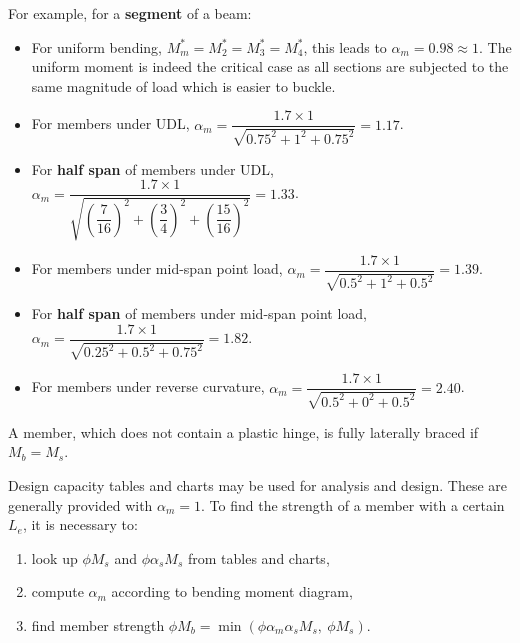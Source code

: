 For example, for a \textbf{segment} of a beam:
\begin{itemize}
\item For uniform bending, $M^*_m=M^*_2=M^*_3=M^*_4$, this leads to $\alpha_m=0.98\approx1$.
The uniform moment is indeed the critical case as all sections are subjected to the same magnitude of load which is easier to buckle.
\begin{figure}[H]
\centering
\end{figure}
\item For members under UDL, $\alpha_m=\dfrac{1.7\times1}{\sqrt{0.75^2+1^2+0.75^2}}=1.17$.
\begin{figure}[H]
\centering
\end{figure}
\item For \textbf{half span} of members under UDL, $\alpha_m=\dfrac{1.7\times1}{\sqrt{\left(\dfrac{7}{16}\right)^2+\left(\dfrac{3}{4}\right)^2+\left(\dfrac{15}{16}\right)^2}}=1.33$.
\begin{figure}[H]
\centering
\end{figure}
\item For members under mid-span point load, $\alpha_m=\dfrac{1.7\times1}{\sqrt{0.5^2+1^2+0.5^2}}=1.39$.
\begin{figure}[H]
\centering
\end{figure}
\item For \textbf{half span} of members under mid-span point load, $\alpha_m=\dfrac{1.7\times1}{\sqrt{0.25^2+0.5^2+0.75^2}}=1.82$.
\begin{figure}[H]
\centering
\end{figure}
\item For members under reverse curvature, $\alpha_m=\dfrac{1.7\times1}{\sqrt{0.5^2+0^2+0.5^2}}=2.40$.
\begin{figure}[H]
\centering
\end{figure}
\end{itemize}

A member, which does not contain a plastic hinge, is fully laterally braced if $M_b=M_s$.

Design capacity tables and charts may be used for analysis and design.
These are generally provided with $\alpha_m=1$.
To find the strength of a member with a certain $L_e$, it is necessary to:
\begin{enumerate}
\item look up $\phi{}M_s$ and $\phi{}\alpha_sM_s$ from tables and charts,
\item compute $\alpha_m$ according to bending moment diagram,
\item find member strength $\phi{}M_b=\min\left(\phi\alpha_m\alpha_sM_s,~\phi{}M_s\right)$.
\end{enumerate}

